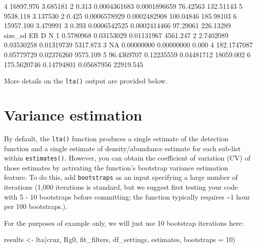 \documentclass[
]{book}
\newenvironment{Shaded}{\begin{snugshade}}{\end{snugshade}}
\newcommand{\AttributeTok}[1]{\textcolor[rgb]{0.77,0.63,0.00}{#1}}
\newcommand{\ConstantTok}[1]{\textcolor[rgb]{0.00,0.00,0.00}{#1}}
\newcommand{\DecValTok}[1]{\textcolor[rgb]{0.00,0.00,0.81}{#1}}
\newcommand{\FloatTok}[1]{\textcolor[rgb]{0.00,0.00,0.81}{#1}}
\newcommand{\FunctionTok}[1]{\textcolor[rgb]{0.00,0.00,0.00}{#1}}
\newcommand{\NormalTok}[1]{#1}
\newcommand{\OtherTok}[1]{\textcolor[rgb]{0.56,0.35,0.01}{#1}}
\begin{document}
\begin{Shaded}
\begin{Highlighting}[]
\DecValTok{4}    \FloatTok{16897.976} \FloatTok{3.685181} \DecValTok{2}  \FloatTok{0.313} \FloatTok{0.0004361683} \FloatTok{0.0001896659}   \FloatTok{76.42563} \FloatTok{132.51143}
\DecValTok{5}     \FloatTok{9538.118} \FloatTok{3.137530} \DecValTok{2}  \FloatTok{0.425} \FloatTok{0.0006578929} \FloatTok{0.0002482908}  \FloatTok{100.04846} \FloatTok{185.98103}
\DecValTok{6}    \FloatTok{15957.100} \FloatTok{3.479991} \DecValTok{3}  \FloatTok{0.393} \FloatTok{0.0006542525} \FloatTok{0.0002414466}   \FloatTok{97.29061} \FloatTok{226.13289}
\NormalTok{      size\_sd         ER          D         N}
\DecValTok{1}   \FloatTok{0.5780968} \FloatTok{0.03153029} \FloatTok{0.01131967}  \FloatTok{4561.247}
\DecValTok{2}   \FloatTok{2.7402089} \FloatTok{0.03530258} \FloatTok{0.01319739}  \FloatTok{5317.873}
\DecValTok{3}          \ConstantTok{NA} \FloatTok{0.00000000} \FloatTok{0.00000000}     \FloatTok{0.000}
\DecValTok{4} \FloatTok{182.1747087} \FloatTok{0.05779729} \FloatTok{0.02376260}  \FloatTok{9575.109}
\DecValTok{5}  \FloatTok{96.4369707} \FloatTok{0.12235559} \FloatTok{0.04481712} \FloatTok{18059.002}
\DecValTok{6} \FloatTok{175.5620746} \FloatTok{0.14794801} \FloatTok{0.05687956} \FloatTok{22919.545}
\end{Highlighting}
\end{Shaded}

More details on the \texttt{lta()} output are provided below.

\hypertarget{variance-estimation}{%
\section*{Variance estimation}\label{variance-estimation}}

By default, the \texttt{lta()} function produces a single estimate of the detection function and a single estimate of density/abundance estimate for each sub-list within \texttt{estimates()}. However, you can obtain the coefficient of variation (CV) of those estimates by activating the function's bootstrap variance estimation feature. To do this, add \texttt{bootstraps} as an input specifying a large number of iterations (1,000 iterations is standard, but we suggest first testing your code with 5 - 10 bootstraps before committing; the function typically requires \textasciitilde1 hour per 100 bootstraps.).

For the purposes of example only, we will just use 10 bootstrap iterations here:

\begin{Shaded}
\begin{Highlighting}[]
\NormalTok{results }\OtherTok{\textless{}{-}} \FunctionTok{lta}\NormalTok{(cruz, Rg0,}
\NormalTok{               fit\_filters, df\_settings, estimates,}
               \AttributeTok{bootstraps =} \DecValTok{10}\NormalTok{)}
\end{Highlighting}
\end{Shaded}
\end{document}
